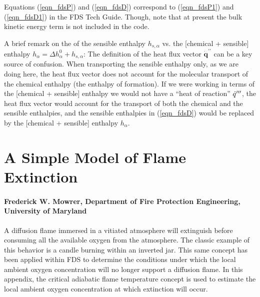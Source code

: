 Equations (\ref{eqn_fdsP}) and (\ref{eqn_fdsD}) correspond to (\ref{eqn_fdsP1}) and (\ref{eqn_fdsD1}) in the FDS Tech Guide.  Though, note that at present the bulk kinetic energy term is not included in the code.

A brief remark on the of the sensible enthalpy $h_{s,\alpha}$ vs. the [chemical + sensible] enthalpy $h_\alpha = \Delta h_\alpha^0 + h_{s,\alpha}$:
The definition of the heat flux vector $\dot{\mathbf{q}}^{\prime\prime}$ can be a key source of confusion.
When transporting the sensible enthalpy only, as we are doing here, the heat flux vector does not account for the molecular transport of the
chemical enthalpy (the enthalpy of formation).  If we were working in terms of the [chemical + sensible] enthalpy we would not have
a ``heat of reaction'' $\dot{q}^{{\prime\prime\prime}}$, the heat flux vector would account for the transport of both the chemical and the sensible enthalpies,
and the sensible enthalpies in (\ref{eqn_fdsD}) would be replaced by the [chemical + sensible] enthalpy $h_{\alpha}$.






\chapter{A Simple Model of Flame Extinction}

\subsubsection{Frederick W. Mowrer, Department of Fire Protection Engineering, University of Maryland}

\label{mowrer_model}


A diffusion flame immersed in a vitiated atmosphere will extinguish before consuming all the
available oxygen from the atmosphere.  The classic example of this behavior is a candle burning
within an inverted jar.  This same concept has been applied within FDS
to determine the conditions under which the local ambient oxygen concentration will no longer
support a diffusion flame.  In this appendix, the critical adiabatic flame temperature
concept is used to estimate the local ambient oxygen concentration at which extinction will
occur.

